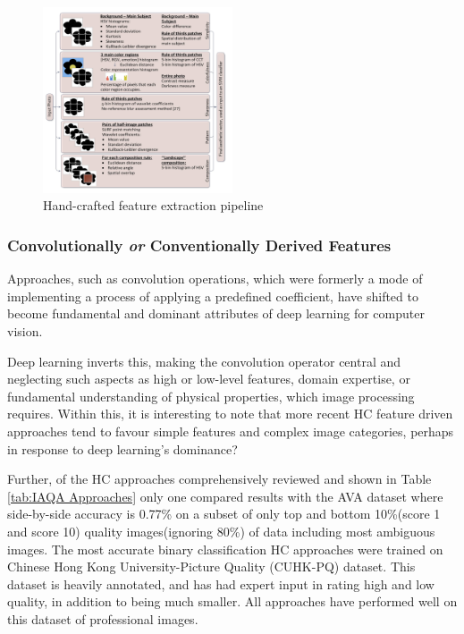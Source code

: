     \begin{figure}[ht!]
    \centering
    \specialrule{0.01em}{0.2em}{0.2em}
    \includegraphics[width=0.5\textwidth]{figures/Literature Review/Hand_crafted/Mavridaki2015_pipline.png}
    \caption{Hand-crafted feature extraction pipeline \cite{Mavridaki2015}}
    \label{fig:handcrafted}
    \specialrule{0.01em}{0.2em}{0.2em}
    \end{figure}

\subsubsection{Convolutionally \emph{or} Conventionally Derived Features}

Approaches, such as convolution operations, which were formerly a mode of implementing a process of applying a predefined coefficient, have shifted to become fundamental and dominant attributes of deep learning for computer vision. 

Deep learning inverts this, making the convolution operator central and neglecting such aspects as high or low-level features, domain expertise, or fundamental understanding of physical properties, which image processing requires. Within this, it is interesting to note that more recent HC feature driven approaches tend to favour simple features and complex image categories\cite{Mavridaki2015,Gao2015a}, perhaps in response to deep learning's dominance? 

Further, of the HC approaches comprehensively reviewed and shown in Table \ref{tab:IAQA Approaches} only one compared results with the AVA dataset \cite{Mavridaki2015} where side-by-side accuracy is 0.77\% on a subset of only top and bottom 10\%(score 1 and score 10) quality images(ignoring 80\%) of data including most ambiguous images. The most accurate binary classification HC approaches were trained on Chinese Hong Kong University-Picture Quality (CUHK-PQ) dataset\cite{Lo2012a}. This dataset is heavily annotated, and has had expert input in rating high and low quality, in addition to being much smaller. All approaches have performed well on this dataset of professional images. 

